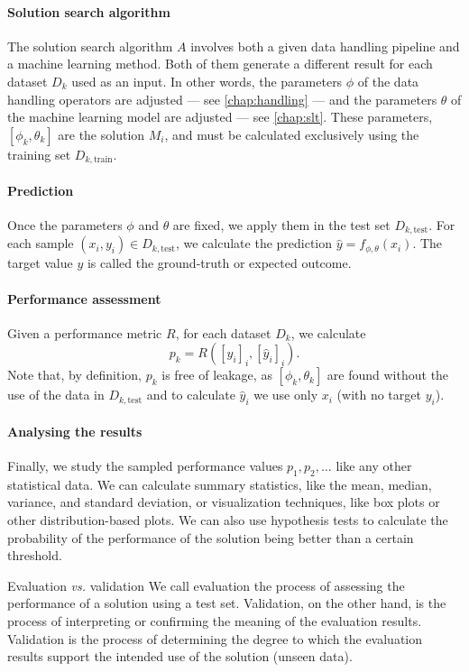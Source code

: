 \paragraph{Solution search algorithm}  The solution search algorithm $A$ involves both a
given data handling pipeline and a machine learning method.  Both of them generate a
different result for each dataset $D_k$ used as an input.  In other words, the parameters
$\phi$ of the data handling operators are adjusted --- see \cref{chap:handling} --- and the
parameters $\theta$ of the machine learning model are adjusted --- see \cref{chap:slt}.
These parameters, $\left[\phi_k, \theta_k\right]$ are the solution $M_i$, and must be
calculated exclusively using the training set $D_{k,\text{train}}$.

\paragraph{Prediction}  Once the parameters $\phi$ and $\theta$ are fixed, we apply them
in the test set $D_{k,\text{test}}$.  For each sample $(x_i, y_i) \in D_{k,\text{test}}$,
we calculate the prediction $\hat{y} = f_{\phi,\theta}(x_i)$.  The target value $y$ is
called the ground-truth or expected outcome.

\paragraph{Performance assessment} Given a performance metric $R$, for each dataset $D_k$,
we calculate
$$p_k = R\!\left(\left[y_i\right]_i, \left[\hat{y}_i\right]_i\right)\text{.}$$
Note that, by definition, $p_k$ is free of \gls{leakage}, as $\left[\phi_k,
\theta_k\right]$ are found without the use of the data in $D_{k,\text{test}}$ and to
calculate $\hat{y}_i$ we use only $x_i$ (with no target $y_i$).

\paragraph{Analysing the results} Finally, we study the sampled performance values $p_1,
p_2, \ldots$ like any other statistical data.  We can calculate summary statistics, like
the mean, median, variance, and standard deviation, or visualization techniques, like
box plots or other distribution-based plots.  We can also use hypothesis tests to
calculate the probability of the performance of the solution being better than a certain
threshold.

\begin{hlbox}{Evaluation \emph{vs.} validation}
  We call evaluation the process of assessing the performance of a solution using a
  test set.  Validation, on the other hand, is the process of interpreting or confirming
  the meaning of the evaluation results.  Validation is the process of determining the
  degree to which the evaluation results support the intended use of the solution (unseen
  data).
\end{hlbox}

